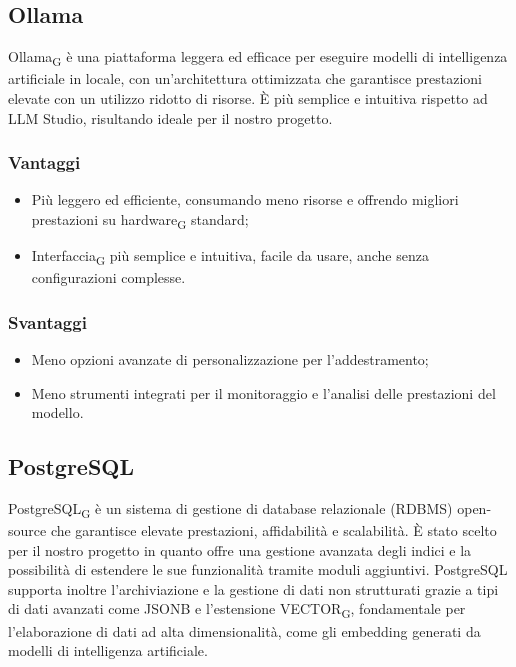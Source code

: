 \subsection{Ollama}
Ollama\textsubscript{G} è una piattaforma leggera ed efficace per eseguire modelli di intelligenza artificiale in locale, con un'architettura ottimizzata che garantisce prestazioni elevate con un utilizzo ridotto di risorse. È più semplice e intuitiva rispetto ad LLM Studio, risultando ideale per il nostro progetto.
\subsubsection{Vantaggi}
\begin{itemize}
    \item Più leggero ed efficiente, consumando meno risorse e offrendo migliori prestazioni su hardware\textsubscript{G} standard;
    \item Interfaccia\textsubscript{G} più semplice e intuitiva, facile da usare, anche senza configurazioni complesse.
\end{itemize}
\subsubsection{Svantaggi}
\begin{itemize}
    \item Meno opzioni avanzate di personalizzazione per l'addestramento;
    \item Meno strumenti integrati per il monitoraggio e l'analisi delle prestazioni del modello.
\end{itemize}

\subsection{PostgreSQL}
PostgreSQL\textsubscript{G} è un sistema di gestione di database relazionale (RDBMS) open-source che garantisce elevate prestazioni, affidabilità e scalabilità. È stato scelto per il nostro progetto in quanto offre una gestione avanzata degli indici e la possibilità di estendere le sue funzionalità tramite moduli aggiuntivi. PostgreSQL supporta inoltre l’archiviazione e la gestione di dati non strutturati grazie a tipi di dati avanzati come JSONB e l’estensione VECTOR\textsubscript{G}, fondamentale per l’elaborazione di dati ad alta dimensionalità, come gli embedding generati da modelli di intelligenza artificiale.
